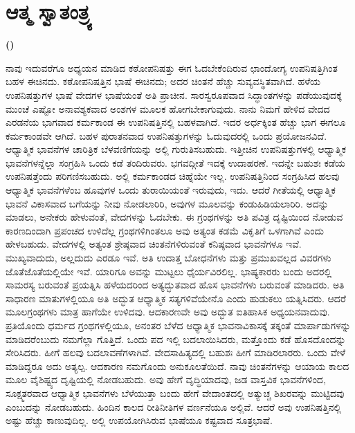 \chapter{ಆತ್ಮ ಸ್ವಾತಂತ್ರ್ಯ}%

\centerline{\textbf{(\fontsize{12pt}{14pt}\selectfont{ಲಂಡನ್ನಿನಲ್ಲಿ ೧೮೯೬ರ ನವೆಂಬರ್​ ೫ ರಂದು ನೀಡಿದ ಉಪನ್ಯಾಸ})}}


ನಾವು ಇದುವರೆಗೂ ಅಧ್ಯಯನ ಮಾಡಿದ ಕಠೋಪನಿಷತ್ತು ಈಗ ಓದಬೇಕೆಂದಿರುವ ಛಾಂದೋಗ್ಯ ಉಪನಿಷತ್ತಿಗಿಂತ ಬಹಳ ಈಚಿನದು. ಕಠೋಪನಿಷತ್ತಿನ ಭಾಷೆ ಈಚಿನದು; ಅದರ ಚಿಂತನೆ ಹೆಚ್ಚು ಸುವ್ಯವಸ್ಥಿತವಾಗಿದೆ. ಹಳೆಯ ಉಪನಿಷತ್ತುಗಳ ಭಾಷೆ ವೇದಗಳ ಭಾಷೆಯಂತೆ ಅತಿ ಪ್ರಾಚೀನ. ಸಾರಸ್ವರೂಪವಾದ ಸಿದ್ಧಾಂತಗಳನ್ನು ಪಡೆಯುವುದಕ್ಕೆ ಮುಂಚೆ ಎಷ್ಟೋ ಅನಾವಶ್ಯಕವಾದ ಅಂಶಗಳ ಮೂಲಕ ಹೋಗಬೇಕಾಗುವುದು. ನಾನು ನಿಮಗೆ ಹೇಳಿದ ವೇದದ ಎರಡನೆಯ ಭಾಗವಾದ ಕರ್ಮಕಾಂಡ ಈ ಉಪನಿಷತ್ತಿನಲ್ಲಿ ಬಹಳವಾಗಿದೆ. ಇದರ ಅರ್ಧಕ್ಕಿಂತ ಹೆಚ್ಚು ಭಾಗ ಈಗಲೂ ಕರ್ಮಕಾಂಡವೇ ಆಗಿದೆ. ಬಹಳ ಪುರಾತನವಾದ ಉಪನಿಷತ್ತುಗಳನ್ನು ಓದುವುದರಲ್ಲಿ ಒಂದು ಪ್ರಯೋಜನವಿದೆ. ಆಧ್ಯಾತ್ಮಿಕ ಭಾವನೆಗಳ ಚಾರಿತ್ರಿಕ ಬೆಳವಣಿಗೆಯನ್ನು ಅಲ್ಲಿ ಗುರುತಿಸಬಹುದು. ಇತ್ತೀಚಿನ ಉಪನಿಷತ್ತುಗಳಲ್ಲಿ ಆಧ್ಯಾತ್ಮಿಕ ಭಾವನೆಗಳನ್ನೆಲ್ಲಾ ಸಂಗ್ರಹಿಸಿ ಒಂದು ಕಡೆ ತಂದಿರುವರು. ಭಗವದ್ಗೀತೆ ಇದಕ್ಕೆ ಉದಾಹರಣೆ. ಇದನ್ನೇ ಬಹುಶಃ ಕಡೆಯ ಉಪನಿಷತ್ತೆಂದು ಪರಿಗಣಿಸಬಹುದು. ಅಲ್ಲಿ ಕರ್ಮಕಾಂಡದ ಚಿಹ್ನೆಯೇ ಇಲ್ಲ. ಉಪನಿಷತ್ತಿನಿಂದ ಸಂಗ್ರಹಿಸಿದ ಹಲವು ಆಧ್ಯಾತ್ಮಿಕ ಭಾವನೆಗಳೆಂಬ ಹೂವುಗಳ ಒಂದು ತುರಾಯಿಯಂತೆ ಇರುವುದು, ಇದು. ಆದರೆ ಗೀತೆಯಲ್ಲಿ ಆಧ್ಯಾತ್ಮಿಕ ಭಾವನೆ ವಿಕಾಸವಾದ ಬಗೆಯನ್ನು ನೀವು ನೋಡಲಾರಿರಿ, ಅವುಗಳ ಮೂಲವನ್ನು ಕಂಡುಹಿಡಿಯಲಾರಿರಿ. ಅದನ್ನು ಮಾಡಲು, ಅನೇಕರು ಹೇಳುವಂತೆ, ವೇದಗಳನ್ನು ಓದಬೇಕು. ಈ ಗ್ರಂಥಗಳನ್ನು ಅತಿ ಪವಿತ್ರ ದೃಷ್ಟಿಯಿಂದ ನೋಡುವ ಕಾರಣದಿಂದಾಗಿ ಪ್ರಪಂಚದ ಉಳಿದೆಲ್ಲ ಗ್ರಂಥಗಳಿಗಿಂತಲೂ ಅವು ಅತ್ಯಂತ ಕಡಮೆ ವಿಕೃತಿಗೆ ಒಳಗಾಗಿವೆ ಎಂದು ಹೇಳಬಹುದು. ವೇದಗಳಲ್ಲಿ ಅತ್ಯಂತ ಶ್ರೇಷ್ಠವಾದ ಚಿಂತನೆಗಳಿರುವಂತೆ ಕನಿಷ್ಠವಾದ ಭಾವನೆಗಳೂ ಇವೆ. ಮುಖ್ಯವಾದುದು, ಅಲ್ಲದುದು ಎರಡೂ ಇವೆ. ಅತಿ ಉದಾತ್ತ ಬೋಧನೆಗಳು ಮತ್ತು ಪ್ರಮುಖವಲ್ಲದ ವಿವರಗಳು ಜೊತೆಜೊತೆಯಲ್ಲಿಯೇ ಇವೆ. ಯಾರಿಗೂ ಅವನ್ನು ಮುಟ್ಟಲು ಧೈರ್ಯವಿರಲಿಲ್ಲ. ಭಾಷ್ಯಕಾರರು ಬಂದು ಅದರಲ್ಲಿ ಸಾಮರಸ್ಯ ಬರುವಂತೆ ಪ್ರಯತ್ನಿಸಿ ಹಳೆಯದರಿಂದ ಅತ್ಯದ್ಭುತವಾದ ಹೊಸ ಭಾವನೆಗಳು ಬರುವಂತೆ ಮಾಡಿದರು. ಅತಿ ಸಾಧಾರಣ ಮಾತುಗಳಲ್ಲಿಯೂ ಅತಿ ಅದ್ಭುತ ಆಧ್ಯಾತ್ಮಿಕ ಸತ್ಯಗಳಿವೆಯೇನೊ ಎಂದು ಹುಡುಕಲು ಯತ್ನಿಸಿದರು. ಆದರೆ ಮೂಲಗ್ರಂಥಗಳು ಮಾತ್ರ ಹಾಗೆಯೇ ಉಳಿದವು. ಆದಕಾರಣವೇ ಅವು ಅದ್ಭುತ ಐತಿಹಾಸಿಕ ಅಧ್ಯಯನವಾದುವು. ಪ್ರತಿಯೊಂದು ಧರ್ಮದ ಗ್ರಂಥಗಳಲ್ಲಿಯೂ, ಅನಂತರ ಬೆಳೆದ ಆಧ್ಯಾತ್ಮಿಕ ಭಾವನಾವಿಕಾಸಕ್ಕೆ ತಕ್ಕಂತೆ ಮಾರ್ಪಾಡುಗಳನ್ನು ಮಾಡಿದರೆಂಬುದು ನಮಗೆಲ್ಲಾ ಗೊತ್ತಿದೆ. ಒಂದು ಪದ ಇಲ್ಲಿ ಬದಲಾಯಿಸಿದರು, ಮತ್ತೊಂದು ಕಡೆ ಹೊಸದೊಂದನ್ನು ಸೇರಿಸಿದರು. ಹೀಗೆ ಹಲವು ಬದಲಾವಣೆಗಳಾಗಿವೆ. ವೇದಸಾಹಿತ್ಯದಲ್ಲಿ ಬಹುಶಃ ಹೀಗೆ ಮಾಡಿರಲಾರರು. ಒಂದು ವೇಳೆ ಮಾಡಿದ್ದರೂ ಅದು ಅತ್ಯಲ್ಪ. ಆದಕಾರಣ ನಮಗೊಂದು ಅನುಕೂಲತೆಯಿದೆ. ನಾವು ಚಿಂತನೆಗಳನ್ನು ಆಯಾಯ ಕಾಲದ ಮೂಲ ವೈಶಿಷ್ಟ್ಯದ ದೃಷ್ಟಿಯಲ್ಲಿ ನೋಡಬಹುದು. ಅವು ಹೇಗೆ ವೃದ್ಧಿಯಾದವು, ಜಡ ವಾಸ್ತವಿಕ ಭಾವನೆಗಳಿಂದ, ಸೂಕ್ಷ್ಮತರವಾದ ಆಧ್ಯಾತ್ಮಿಕ ಭಾವನೆಗಳು ಬೆಳೆಯುತ್ತಾ ಬಂದು ಹೇಗೆ ವೇದಾಂತದಲ್ಲಿ ಅತ್ಯುಚ್ಚ ಶಿಖರವನ್ನು ಮುಟ್ಟಿದವು ಎಂಬುದನ್ನು ನೋಡಬಹುದು. ಹಿಂದಿನ ಕಾಲದ ರೀತಿನೀತಿಗಳ ವರ್ಣನೆಯೂ ಅಲ್ಲಿವೆ. ಆದರೆ ಅವು ಉಪನಿಷತ್ತಿನಲ್ಲಿ ಅಷ್ಟು ಹೆಚ್ಚು ಕಾಣುವುದಿಲ್ಲ. ಅಲ್ಲಿ ಉಪಯೋಗಿಸಿರುವ ಭಾಷೆಯೂ ಕಷ್ಟವಾದ ಸೂತ್ರಭಾಷೆ.

